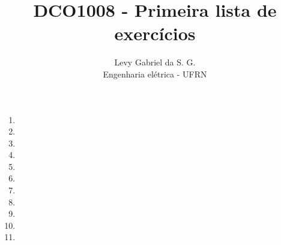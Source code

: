 \title{DCO1008 - Primeira lista de exercícios}
\author{Levy Gabriel da S. G. \\ Engenharia elétrica - UFRN}

\maketitle
\thispagestyle{fancy}

\begin{enumerate}
    \item 
    \item 
    \item 
    \item 
    \item 
    \item 
    \item 
    \item 
    \item 
    \item 
    \item 
\end{enumerate}